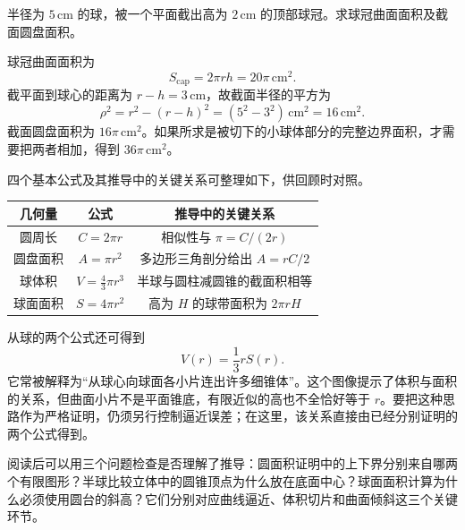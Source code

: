 \documentclass[UTF8,12pt,a4paper,fontset=fandol]{ctexart}
\begin{document}
\begin{example}[球冠的曲面面积与截面圆盘面积]
半径为 $5\,\mathrm{cm}$ 的球，被一个平面截出高为 $2\,\mathrm{cm}$ 的顶部球冠。求球冠曲面面积及截面圆盘面积。
\end{example}
\begin{solve}
球冠曲面面积为
\[
  S_{\mathrm{cap}}=2\pi rh=20\pi\,\mathrm{cm}^2.
\]
截平面到球心的距离为 $r-h=3\,\mathrm{cm}$，故截面半径的平方为
\[
  \rho^2=r^2-(r-h)^2=(5^2-3^2)\,\mathrm{cm}^2=16\,\mathrm{cm}^2.
\]
截面圆盘面积为 $16\pi\,\mathrm{cm}^2$。如果所求是被切下的小球体部分的完整边界面积，才需要把两者相加，得到 $36\pi\,\mathrm{cm}^2$。
\end{solve}

四个基本公式及其推导中的关键关系可整理如下，供回顾时对照。
\begin{center}
\begin{tabular}{c c c}
\toprule
几何量 & 公式 & 推导中的关键关系 \\
\midrule
圆周长 & $C=2\pi r$ & 相似性与 $\pi=C/(2r)$ \\
圆盘面积 & $A=\pi r^2$ & 多边形三角剖分给出 $A=rC/2$ \\
球体积 & $V=\frac43\pi r^3$ & 半球与圆柱减圆锥的截面积相等 \\
球面面积 & $S=4\pi r^2$ & 高为 $H$ 的球带面积为 $2\pi rH$ \\
\bottomrule
\end{tabular}
\end{center}

从球的两个公式还可得到
\[
  V(r)=\frac13rS(r).
\]
它常被解释为“从球心向球面各小片连出许多细锥体”。这个图像提示了体积与面积的关系，但曲面小片不是平面锥底，有限近似的高也不全恰好等于 $r$。要把这种思路作为严格证明，仍须另行控制逼近误差；在这里，该关系直接由已经分别证明的两个公式得到。

阅读后可以用三个问题检查是否理解了推导：圆面积证明中的上下界分别来自哪两个有限图形？半球比较立体中的圆锥顶点为什么放在底面中心？球面面积计算为什么必须使用圆台的斜高？它们分别对应曲线逼近、体积切片和曲面倾斜这三个关键环节。
\end{document}
